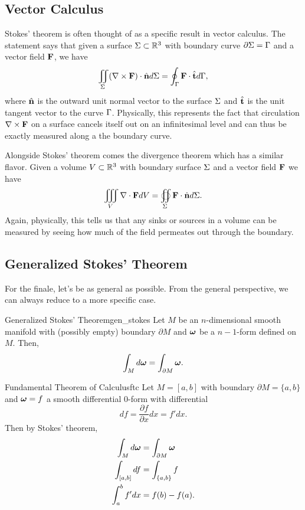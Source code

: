 \subsection{Vector Calculus}

Stokes' theorem is often thought of as a specific result in vector calculus. The statement says that given a surface $\Sigma \subset \mathbb{R}^3$ with boundary curve $\partial \Sigma = \Gamma$ and a vector field $\mathbf{F}$, we have
\[
\iint_\Sigma (\nabla \times \mathbf{F})\cdot \hat{\mathbf{n}} d\Sigma = \oint_\Gamma \mathbf{F} \cdot \hat{\mathbf{t}} d\Gamma,
\]
where $\hat{\mathbf{n}}$ is the outward unit normal vector to the surface $\Sigma$ and $\hat{\mathbf{t}}$ is the unit tangent vector to the curve $\Gamma$. Physically, this represents the fact that circulation $\nabla \times \mathbf{F}$ on a surface cancels itself out on an infinitesimal level and can thus be exactly measured along a the boundary curve.

Alongside Stokes' theorem comes the divergence theorem which has a similar flavor.  Given a volume $V \subset \mathbb{R}^3$ with boundary surface $\Sigma$ and a vector field $\mathbf{F}$ we have
\[
\iiint_V \nabla \cdot \mathbf{F} dV = \oiint_\Sigma \mathbf{F} \cdot \hat{\mathbf{n}} d\Sigma.
\]
Again, physically, this tells us that any sinks or sources in a volume can be measured by seeing how much of the field permeates out through the boundary.


\subsection{Generalized Stokes' Theorem}

For the finale, let's be as general as possible.  From the general perspective, we can always reduce to a more specific case.  

\begin{thm}{Generalized Stokes' Theorem}{gen_stokes}
Let $M$ be an $n$-dimensional smooth manifold with (possibly empty) boundary $\partial M$ and $\boldsymbol{\omega}$ be a $n-1$-form defined on $M$.  Then,
\[
\int_M d\boldsymbol{\omega} = \int_{\partial M} \boldsymbol{\omega}.
\]
\end{thm}

\begin{ex}{Fundamental Theorem of Calculus}{ftc}
Let $M=[a,b]$ with boundary $\partial M = \{a,b\}$ and $\boldsymbol{\omega}=f$ a smooth differential 0-form with differential
\[
df= \frac{\partial f}{\partial x}dx = f'dx.
\]
Then by Stokes' theorem,
\begin{align*}
    \int_M d\boldsymbol{\omega} &= \int_{\partial M}\boldsymbol{\omega}\\
    \int_{[a,b]} df & = \int_{\{a,b\}} f\\
    \int_a^b f'dx &= f(b)-f(a).
\end{align*}
\end{ex}

